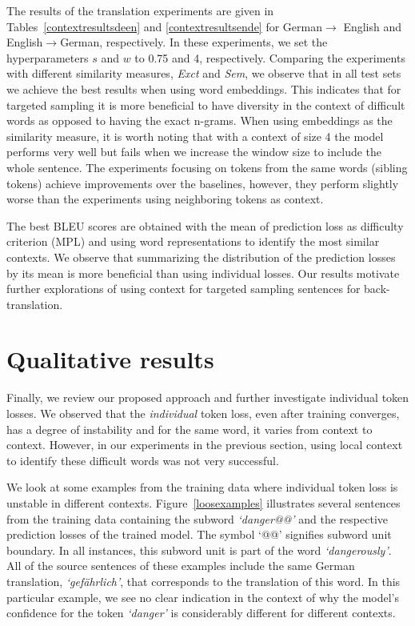 The results of the translation experiments are given in Tables~\ref{contextresultsdeen} and \ref{contextresultsende} for German$\rightarrow$ English and English$\rightarrow$German, respectively.
In these experiments, we set the hyperparameters $s$ and $w$ to 0.75 and 4, respectively.
Comparing the experiments with different similarity measures, \textit{Exct} and \textit{Sem}, we observe that in all test sets we achieve the best results when using word embeddings.
This indicates that for targeted sampling it is more beneficial to have diversity in the context of difficult words as opposed to having the exact n-grams. 
When using embeddings as the similarity measure, it is worth noting that with a context of size 4 the model performs very well but fails when we increase the window size to include the whole sentence. 
The experiments focusing on tokens from the same words ({sibling} tokens) achieve improvements over the baselines, however, they perform slightly worse than the experiments using {neighboring} tokens as context.

The best BLEU scores are obtained with the mean of prediction loss as difficulty criterion (\textsc{MPL}) and using word representations to identify the most similar contexts.
We observe that summarizing the distribution of the prediction losses by its mean is more beneficial than using individual losses.
Our results motivate further explorations of using context for targeted sampling sentences for back-translation.


\section{Qualitative results} \label{btanalysisagain}

Finally, we review our proposed approach and further investigate individual token losses.
We observed that the \textit{individual} token loss, even after training converges, has a degree of instability and for the same word, it varies from context to context. 
However, in our experiments in the previous section, using local context to identify these difficult words was not very successful. 

We look at some examples from the training data where individual token loss is unstable in different contexts.
Figure~\ref{loosexamples} illustrates several sentences from the training data containing the subword \textit{`danger@@'} and the respective prediction losses of the trained model. The symbol `@@' signifies subword unit boundary. 
%
In all instances, this subword unit is part of the word \textit{`dangerously'}. 
All of the source sentences of these examples include the same German translation, \textit{`gef{\"a}hrlich'}, that corresponds to the translation of this word.
In this particular example, we see no clear indication in the context of why the model's confidence for the token \textit{`danger'} is considerably different for different contexts. 

